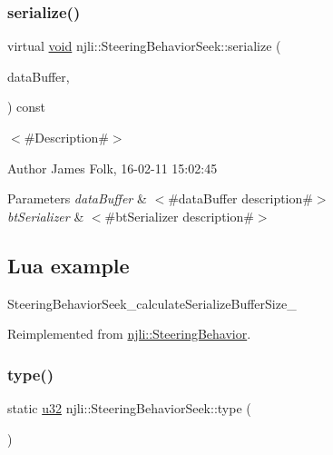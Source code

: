 \subsubsection{\texorpdfstring{serialize()}{serialize()}}
{\footnotesize\ttfamily virtual \mbox{\hyperlink{_thread_8h_af1e856da2e658414cb2456cb6f7ebc66}{void}} njli\+::\+Steering\+Behavior\+Seek\+::serialize (\begin{DoxyParamCaption}\item[{\mbox{\hyperlink{_thread_8h_af1e856da2e658414cb2456cb6f7ebc66}{void}} $\ast$}]{data\+Buffer,  }\item[{bt\+Serializer $\ast$}]{ }\end{DoxyParamCaption}) const\hspace{0.3cm}{\ttfamily [virtual]}}



$<$\#\+Description\#$>$ 

\begin{DoxyAuthor}{Author}
James Folk, 16-\/02-\/11 15\+:02\+:45
\end{DoxyAuthor}

\begin{DoxyParams}{Parameters}
{\em data\+Buffer} & $<$\#data\+Buffer description\#$>$ \\
\hline
{\em bt\+Serializer} & $<$\#bt\+Serializer description\#$>$\\
\hline
\end{DoxyParams}
\hypertarget{classnjli_1_1_steering_behavior_wander_ex1}{}\subsection{Lua example}\label{classnjli_1_1_steering_behavior_wander_ex1}

\begin{DoxyCodeInclude}
\end{DoxyCodeInclude}
Steering\+Behavior\+Seek\+\_\+calculate\+Serialize\+Buffer\+Size\+\_\+ 

Reimplemented from \mbox{\hyperlink{classnjli_1_1_steering_behavior_aa8494cb4a327c0040f64cfe8b393786e}{njli\+::\+Steering\+Behavior}}.

\mbox{\label{classnjli_1_1_steering_behavior_seek_a4182ef705cad2a292e63e87223b8a036}} 
\subsubsection{\texorpdfstring{type()}{type()}}
{\footnotesize\ttfamily static \mbox{\hyperlink{_util_8h_a10e94b422ef0c20dcdec20d31a1f5049}{u32}} njli\+::\+Steering\+Behavior\+Seek\+::type (\begin{DoxyParamCaption}{ }\end{DoxyParamCaption})\hspace{0.3cm}{\ttfamily [static]}}



